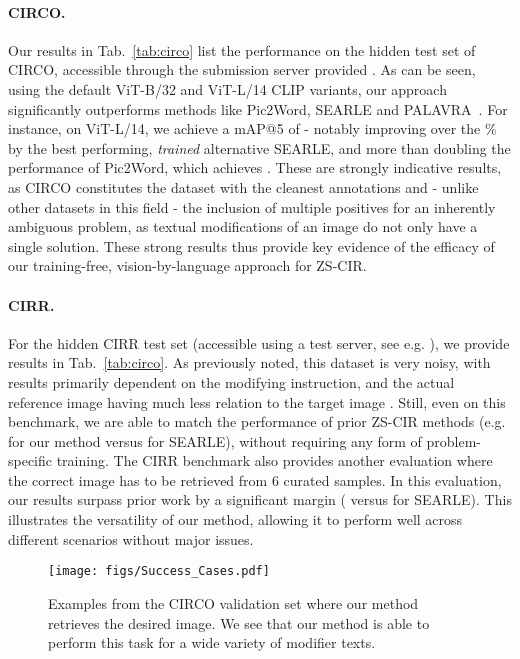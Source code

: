 \documentclass{article} \usepackage{iclr2024_conference,times}
\begin{document}
\paragraph{CIRCO.} 
Our results in Tab.~\ref{tab:circo} list the performance on the hidden test set of CIRCO, accessible through the submission server provided \cite{searle}. 
As can be seen, using the default ViT-B/32 and ViT-L/14 CLIP variants, our approach significantly outperforms methods like Pic2Word, SEARLE and PALAVRA~\citep{palavra}. 
For instance, on ViT-L/14, we achieve a mAP@5 of  - notably improving over the \% by the best performing, \textit{trained} alternative SEARLE, and more than doubling the performance of Pic2Word, which achieves .
These are strongly indicative results, as CIRCO constitutes the dataset with the cleanest annotations and - unlike other datasets in this field - the inclusion of multiple positives for an inherently ambiguous problem, as textual modifications of an image do not only have a single solution.
These strong results thus provide key evidence of the efficacy of our training-free, vision-by-language approach for ZS-CIR.

\vspace{-5pt}
\paragraph{CIRR.} For the hidden CIRR test set (accessible using a test server, see e.g. \citet{cirr}), we provide results in Tab.~\ref{tab:circo}. 
As previously noted, this dataset is very noisy, with results primarily dependent on the modifying instruction, and the actual reference image having much less relation to the target image \citep{pic2word,searle}.
Still, even on this benchmark, we are able to match the performance of prior ZS-CIR methods (e.g.  for our method versus  for SEARLE), without requiring any form of problem-specific training. The CIRR benchmark also provides another evaluation where the correct image has to be retrieved from 6 curated samples. In this evaluation, our results surpass prior work by a significant margin ( versus  for SEARLE).
This illustrates the versatility of our method, allowing it to perform well across different scenarios without major issues.

\begin{figure}[t]
    \centering
    \texttt{[image: figs/Success\_Cases.pdf]}
    \vspace{-10pt}
    \caption{Examples from the CIRCO validation set where our method retrieves the desired image. We see that our method is able to perform this task for a wide variety of modifier texts.}
    \label{fig:success}
\vspace{-5pt}
\end{figure} 
\vspace{-5pt}
\end{document}
